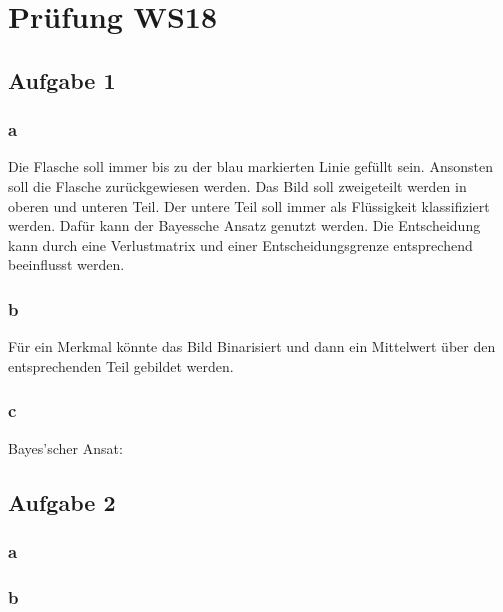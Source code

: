 \documentclass{article}
\begin{document}
\section{Prüfung WS18}

\subsection{Aufgabe 1}

	\subsubsection{a}
	Die Flasche soll immer bis zu der blau markierten Linie gefüllt sein. Ansonsten soll die Flasche zurückgewiesen werden. Das Bild soll zweigeteilt werden in oberen und unteren Teil. Der untere Teil soll immer als Flüssigkeit klassifiziert werden. Dafür kann der Bayessche Ansatz genutzt werden. Die Entscheidung kann durch eine Verlustmatrix und einer Entscheidungsgrenze entsprechend beeinflusst werden.
	
	\subsubsection{b}
	
	Für ein Merkmal könnte das Bild Binarisiert und dann ein Mittelwert über den entsprechenden Teil gebildet werden.

	\subsubsection{c}
	Bayes'scher Ansat: 

\subsection{Aufgabe 2}
	\subsubsection{a}
		\begin{figure}[h]
		\end{figure}

	\subsubsection{b}
		
\end{document}
